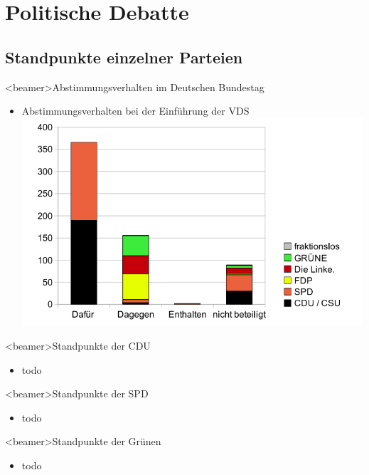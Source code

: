 \section{Politische Debatte}
  \subsection{Standpunkte einzelner Parteien}
        \begin{frame}<beamer>{Abstimmungsverhalten im Deutschen Bundestag}
\begin{itemize}
        \item Abstimmungsverhalten bei der Einführung der VDS
        \includegraphics[height=1\textheight]{sections/img/abstimmung.png}
    \end{itemize}
    \end{frame}
  
  
    \begin{frame}<beamer>{Standpunkte der CDU}
       \begin{itemize}
        \item todo
  
      \end{itemize}
    \end{frame}

  \begin{frame}<beamer>{Standpunkte der SPD}
       \begin{itemize}
        \item todo
  
      \end{itemize}
    \end{frame}
    
    \begin{frame}<beamer>{Standpunkte der Grünen}
       \begin{itemize}
        \item todo
  
      \end{itemize}
    \end{frame}

